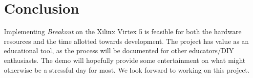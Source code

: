 \documentclass[conference]{IEEEtran}
\begin{document}
\section{Conclusion}

Implementing \emph{Breakout} on the Xilinx Virtex 5 is feasible for both the hardware resources and the time allotted towards development. The project has value as an educational tool, as the process will be documented for other educators/DIY enthusiasts. The demo will hopefully provide some entertainment on what might otherwise be a stressful day for most. We look forward to working on this project.


{}
\end{document}
